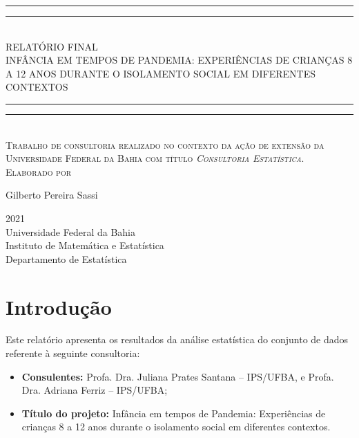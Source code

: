 \documentclass[]{article}
\author{}
\date{\vspace{-2.5em}}
\providecommand{\tightlist}{%
  \setlength{\itemsep}{0pt}\setlength{\parskip}{0pt}}
\newlength{\drop}
\begin{document}
\onehalfspacing

\begin{titlepage}
    \textheight
    \centering
    \vspace*{\baselineskip}
    \rule{\textwidth}{1.6pt}\vspace*{-\baselineskip}\vspace*{2pt}
    \rule{\textwidth}{0.4pt}\\[\baselineskip]
    {\LARGE RELATÓRIO FINAL \\ 
    \vspace*{\baselineskip}
    INFÂNCIA EM TEMPOS DE PANDEMIA: EXPERIÊNCIAS DE CRIANÇAS 8 A 12 ANOS DURANTE O ISOLAMENTO SOCIAL EM DIFERENTES CONTEXTOS}\\[0.2\baselineskip]
    \rule{\textwidth}{0.4pt}\vspace*{-\baselineskip}\vspace{3.2pt}
    \rule{\textwidth}{1.6pt}\\[\baselineskip]
    \scshape
    Trabalho de consultoria realizado no contexto da ação de extensão da Universidade Federal da Bahia com título \textit{Consultoria Estatística}. \\
    \vspace*{2\baselineskip}
    Elaborado por \\[\baselineskip]
    {\Large Gilberto Pereira Sassi\par}
    \vfill
    {\scshape 2021} \\
    {\large Universidade Federal da Bahia}\\
    {\large Instituto de Matemática e Estatística}\\
    {\large Departamento de Estatística}\par
  \end{titlepage}

\newpage

\tableofcontents

\newpage

\hypertarget{introduuxe7uxe3o}{%
\section{Introdução}\label{introduuxe7uxe3o}}

Este relatório apresenta os resultados da análise estatística do conjunto de dados referente à seguinte consultoria:

\begin{itemize}
\tightlist
\item
  \textbf{Consulentes:} Profa. Dra. Juliana Prates Santana -- IPS/UFBA, e Profa. Dra. Adriana Ferriz -- IPS/UFBA;
\item
  \textbf{Título do projeto:} Infância em tempos de Pandemia: Experiências de crianças 8 a 12 anos
  durante o isolamento social em diferentes contextos.
\end{itemize}
\end{document}
